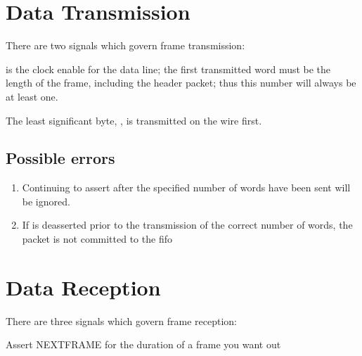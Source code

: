 

\section{Data Transmission}

There are two signals which govern frame transmission: 



 is the clock enable for the data line; the first transmitted
word must be the length of the frame, including the header packet;
thus this number will always be at least one.

The least significant byte, , is transmitted on the
wire first.

\subsection{Possible errors}
\begin{enumerate}
\item Continuing to assert  after the specified
  number of words have been sent will be ignored.
\item If  is deasserted prior to the transmission of the correct number of words, the packet is not committed to the fifo
\end{enumerate}


\section{Data Reception}

There are three signals which govern frame reception: 


Assert NEXTFRAME for the duration of a frame you want out
